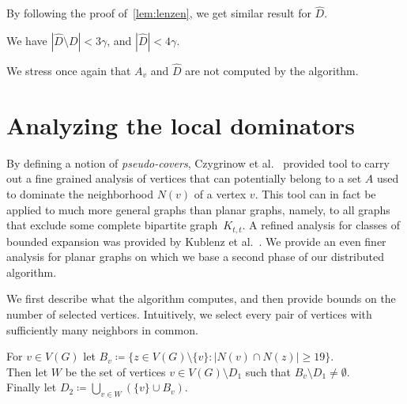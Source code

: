 \documentclass[a4paper,UKenglish,thm-restate,numberwithinsect]{lipics-v2021}
\begin{document}
By following the proof of~\cref{lem:lenzen}, we get similar result for $\hat D$.


\begin{lemma}\label{lem:D-hat}
  We have $|\hat{D}\setminus D|< 3\gamma$, and
  $|\hat{D}|< 4\gamma$.
\end{lemma}

We stress once again that $A_v$ and $\hat D$ are not computed by the algorithm.

\section{Analyzing the local dominators}

By defining a notion of \emph{pseudo-covers}, Czygrinow et  al.~\cite{czygrinow2018distributed} provided tool to carry out a
fine grained analysis of
vertices that can potentially belong to a set $A$ used to dominate
the neighborhood $N(v)$ of a vertex $v$. This tool can in fact
be applied to much more general graphs than planar graphs, namely,
to all graphs that exclude some complete bipartite graph~$K_{t,t}$.
A refined analysis for classes of bounded expansion was provided
by Kublenz et al.~\cite{kublenz2020distributed}.
We provide an even finer analysis for planar graphs on which we
base a second phase of our distributed algorithm.

We first describe what the algorithm computes, and then provide bounds on the
number of selected vertices. Intuitively, we select every pair of vertices with
sufficiently many neighbors in common.

\begin{tcolorbox}[colback=red!5!white,colframe=red!50!black]
  For $v\in V(G)$ let $B_v\coloneqq \{z\in V(G)\setminus
  \{v\}: |N(v)\cap N(z)|\geq 19\}$.\\
  Then let $W$ be the set of vertices $v\in V(G) \setminus D_1$ such
  that $B_v  \setminus D_1 \neq \emptyset$.\\
  Finally let $D_2\coloneqq \bigcup\limits_{v\in W} (\{v\}\cup B_v)$.
\end{tcolorbox}
\end{document}
